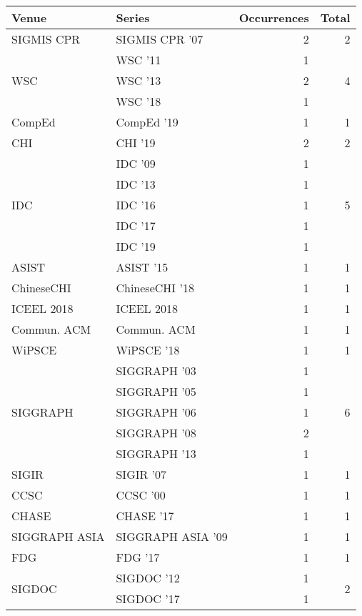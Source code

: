 \begin{table*}[t]
\begin{tabular}{llrr}
Venue & Series & Occurrences & Total\\\hline
\multirow{1}{*}{SIGMIS CPR } & SIGMIS CPR '07 & 2 & \multirow{1}{*}{2}\\
\multirow{3}{*}{WSC } & WSC '11 & 1 & \multirow{3}{*}{4}\\
& WSC '13 & 2 &\\
& WSC '18 & 1 &\\
\multirow{1}{*}{CompEd } & CompEd '19 & 1 & \multirow{1}{*}{1}\\
\multirow{1}{*}{CHI } & CHI '19 & 2 & \multirow{1}{*}{2}\\
\multirow{5}{*}{IDC } & IDC '09 & 1 & \multirow{5}{*}{5}\\
& IDC '13 & 1 &\\
& IDC '16 & 1 &\\
& IDC '17 & 1 &\\
& IDC '19 & 1 &\\
\multirow{1}{*}{ASIST } & ASIST '15 & 1 & \multirow{1}{*}{1}\\
\multirow{1}{*}{ChineseCHI } & ChineseCHI '18 & 1 & \multirow{1}{*}{1}\\
\multirow{1}{*}{ICEEL 2018} & ICEEL 2018 & 1 & \multirow{1}{*}{1}\\
\multirow{1}{*}{Commun. ACM} & Commun. ACM & 1 & \multirow{1}{*}{1}\\
\multirow{1}{*}{WiPSCE } & WiPSCE '18 & 1 & \multirow{1}{*}{1}\\
\multirow{5}{*}{SIGGRAPH } & SIGGRAPH '03 & 1 & \multirow{5}{*}{6}\\
& SIGGRAPH '05 & 1 &\\
& SIGGRAPH '06 & 1 &\\
& SIGGRAPH '08 & 2 &\\
& SIGGRAPH '13 & 1 &\\
\multirow{1}{*}{SIGIR } & SIGIR '07 & 1 & \multirow{1}{*}{1}\\
\multirow{1}{*}{CCSC } & CCSC '00 & 1 & \multirow{1}{*}{1}\\
\multirow{1}{*}{CHASE } & CHASE '17 & 1 & \multirow{1}{*}{1}\\
\multirow{1}{*}{SIGGRAPH ASIA } & SIGGRAPH ASIA '09 & 1 & \multirow{1}{*}{1}\\
\multirow{1}{*}{FDG } & FDG '17 & 1 & \multirow{1}{*}{1}\\
\multirow{2}{*}{SIGDOC } & SIGDOC '12 & 1 & \multirow{2}{*}{2}\\
& SIGDOC '17 & 1 &\\

\end{tabular}
\end{table*}
